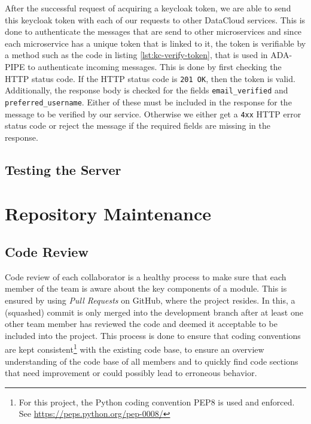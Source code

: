 \documentclass{article}
\begin{document}
            
            After the successful request of acquiring a keycloak token, we are able to send this keycloak token with each of our requests to other DataCloud services. This is done to authenticate the messages that are send to other microservices and since each microservice has a unique token that is linked to it, the token is verifiable by a method such as the code in listing \ref{lst:kc-verify-token}, that is used in ADA-PIPE to authenticate incoming messages. This is done by first checking the HTTP status code. If the HTTP status code is \texttt{201 OK}, then the token is valid. Additionally, the response body is checked for the fields \texttt{email\_verified} and \texttt{preferred\_username}. Either of these must be included in the response for the message to be verified by our service. Otherwise we either get a \texttt{4xx} HTTP error status code or reject the message if the required fields are missing in the response.

            



        \subsection{Testing the Server}
        
    \section{Repository Maintenance}
        
        \subsection{Code Review}

            Code review of each collaborator is a healthy process to make sure that each member of the team is aware about the key components of a module.
            This is ensured by using \emph{Pull Requests} on GitHub, where the project resides. In this, a (squashed) commit is only merged into the development branch after at least one other team member has reviewed the code and deemed it acceptable to be included into the project.
            This process is done to ensure that coding conventions are kept consistent\footnote{For this project, the Python coding convention PEP8 is used and enforced. See \url{https://peps.python.org/pep-0008/}} with the existing code base, to ensure an overview understanding of the code base of all members and to quickly find code sections that need improvement or could possibly lead to erroneous behavior.
\end{document}
